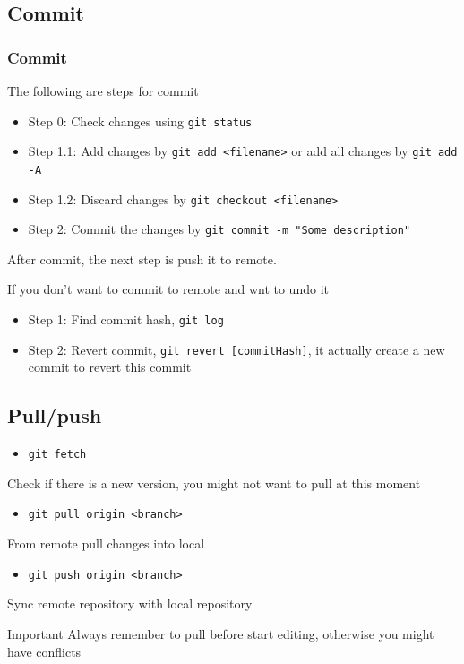 \documentclass{beamer}
\begin{document}
		\subsection{Commit}
			\begin{frame}
				\frametitle{Commit}
				The following are steps for commit
				\begin{itemize}
					\item Step 0: Check changes using \texttt{git status}
					\item Step 1.1: Add changes by \texttt{git add <filename>} or add all changes by \texttt{git add -A}
					\item Step 1.2: Discard changes by \texttt{git checkout <filename>}
					\item Step 2: Commit the changes by \texttt{git commit -m "Some description"}
				\end{itemize}
				After commit, the next step is push it to remote.

				If you don't want to commit to remote and wnt to undo it
				\begin{itemize}
					\item Step 1: Find commit hash, \texttt{git log}
					\item Step 2: Revert commit, \texttt{git revert [commitHash]}, it actually create a new commit to revert this commit
				\end{itemize}
			\end{frame}

		\subsection{Pull/push}
			\begin{frame}
				\begin{itemize}
					\item \texttt{git fetch}
				\end{itemize}
				Check if there is a new version, you might not want to pull at this moment

				\begin{itemize}
					\item \texttt{git pull origin <branch>}
				\end{itemize}
				From remote pull changes into local

				\begin{itemize}
					\item \texttt{git push origin <branch>}
				\end{itemize}
				Sync remote repository with local repository

				\begin{alertblock}{Important}
					Always remember to pull before start editing, otherwise you might have conflicts
				\end{alertblock}
			\end{frame}
\end{document}

